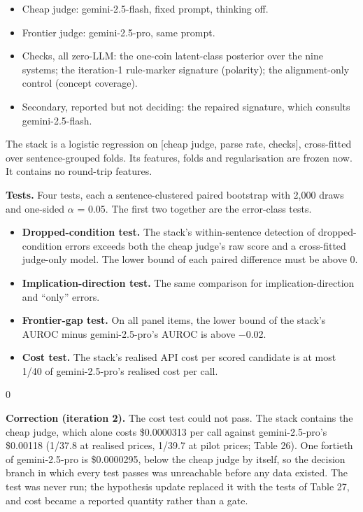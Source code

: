 \documentclass[11pt,letterpaper]{article}
\newenvironment{correction}{\par\medskip\noindent\begin{minipage}{\linewidth}\setlength{\fboxsep}{6pt}\begin{lrbox}{0}\begin{minipage}{0.96\linewidth}\small}{\end{minipage}\end{lrbox}\colorbox{black!6}{\usebox{0}}\end{minipage}\par\medskip}
\begin{document}
\begin{itemize}
\item {}Cheap judge: gemini-2.5-flash, fixed prompt, thinking off.
\item {}Frontier judge: gemini-2.5-pro, same prompt.
\item {}Checks, all zero-LLM: the one-coin latent-class posterior over the nine systems; the iteration-1 rule-marker signature (polarity); the alignment-only control (concept coverage).
\item {}Secondary, reported but not deciding: the repaired signature, which consults gemini-2.5-flash.
\end{itemize}
The stack is a logistic regression on [cheap judge, parse rate, checks], cross-fitted over sentence-grouped folds. Its features, folds and regularisation are frozen now. It contains no round-trip features.

\textbf{Tests.} Four tests, each a sentence-clustered paired bootstrap with 2,000 draws and one-sided $\alpha$ = 0.05. The first two together are the error-class tests.

\begin{itemize}
\item {}\textbf{Dropped-condition test.} The stack's within-sentence detection of dropped-condition errors exceeds both the cheap judge's raw score and a cross-fitted judge-only model. The lower bound of each paired difference must be above 0.
\item {}\textbf{Implication-direction test.} The same comparison for implication-direction and ``only'' errors.
\item {}\textbf{Frontier-gap test.} On all panel items, the lower bound of the stack's AUROC minus gemini-2.5-pro's AUROC is above $-$0.02.
\item {}\textbf{Cost test.} The stack's realised API cost per scored candidate is at most 1/40 of gemini-2.5-pro's realised cost per call.
\end{itemize}
\begin{correction}\textbf{Correction (iteration 2).} The cost test could not pass. The stack contains the cheap judge, which alone costs \$0.0000313 per call against gemini-2.5-pro's \$0.00118 (1/37.8 at realised prices, 1/39.7 at pilot prices; Table 26). One fortieth of gemini-2.5-pro is \$0.0000295, below the cheap judge by itself, so the decision branch in which every test passes was unreachable before any data existed. The test was never run; the hypothesis update replaced it with the tests of Table 27, and cost became a reported quantity rather than a gate.\end{correction}
\end{document}
